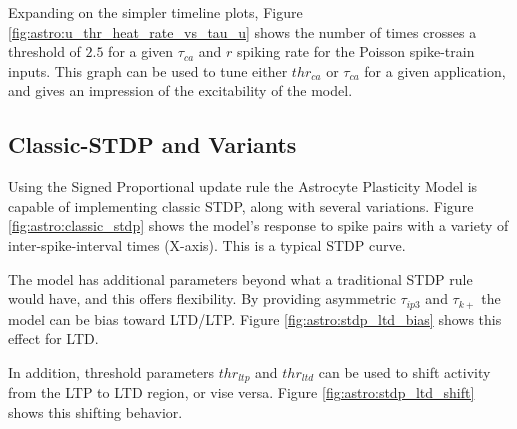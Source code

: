 Expanding on the simpler timeline plots, Figure
\ref{fig:astro:u_thr_heat_rate_vs_tau_u} shows the number of times \ca crosses a
threshold of $2.5$ for a given $\tau_{ca}$ and $r$ spiking rate for the Poisson
spike-train inputs. This graph can be used to tune either $thr_{ca}$ or $\tau_{ca}$
for a given application, and gives an impression of the excitability of the
model.


\subsection{Classic-STDP and Variants} \label{sec:ordered_prop:stdp}

Using the Signed Proportional update rule the Astrocyte Plasticity Model is
capable of implementing classic STDP, along with several variations.  Figure
\ref{fig:astro:classic_stdp} shows the model's response to spike pairs with
a variety of inter-spike-interval times (X-axis). This is a typical STDP
curve.


The model has additional parameters beyond what a traditional STDP rule
would have, and this offers flexibility. By providing asymmetric
$\tau_{ip3}$ and $\tau_{k+}$ the model can be bias toward LTD/LTP. Figure
\ref{fig:astro:stdp_ltd_bias} shows this effect for LTD.


In addition, threshold parameters $thr_{ltp}$ and $thr_{ltd}$ can be used to
shift activity from the LTP to LTD region, or vise versa. Figure
\ref{fig:astro:stdp_ltd_shift} shows this shifting behavior.



